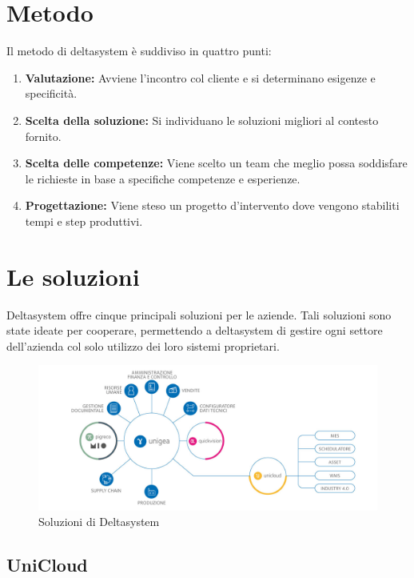 \documentclass[target=bach,aauheader=,style=]{thud}
\begin{document}
\section{Metodo}
Il metodo di deltasystem è suddiviso in quattro punti:

\begin{enumerate}
    \item \textbf{Valutazione:} Avviene l'incontro col cliente e si determinano esigenze e specificità.
    \item \textbf{Scelta della soluzione:} Si individuano le soluzioni migliori al contesto fornito.
    \item \textbf{Scelta delle competenze:} Viene scelto un team che meglio possa soddisfare le richieste in base a specifiche competenze e esperienze.
    \item \textbf{Progettazione:} Viene steso un progetto d'intervento dove vengono stabiliti tempi e step produttivi.
\end{enumerate}

\section{Le soluzioni}

Deltasystem offre cinque principali soluzioni per le aziende.
Tali soluzioni sono state ideate per cooperare, permettendo a deltasystem di gestire ogni settore dell'azienda col solo utilizzo dei loro sistemi proprietari.

\begin{figure}[h]
    \centering
    \includegraphics[width=1\textwidth]{soluzioni.jpg}
    \caption{Soluzioni di Deltasystem}
\end{figure}

\clearpage
\subsection{UniCloud}
\end{document}
